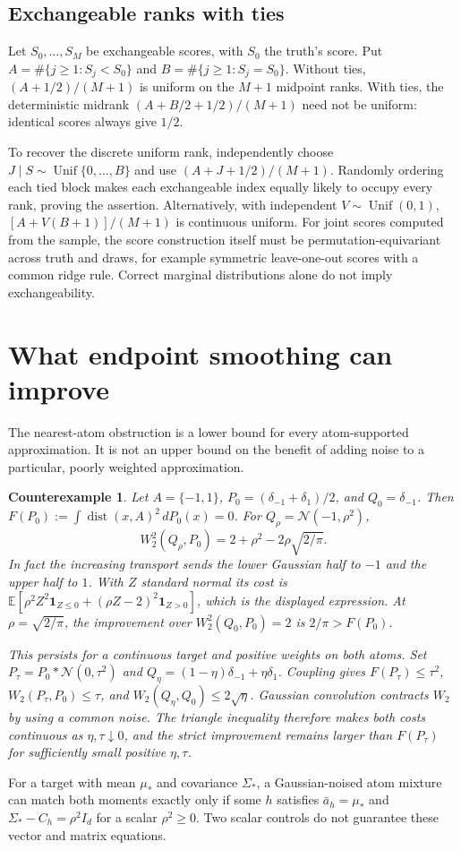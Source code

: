 \documentclass[11pt]{article}
\newtheorem{example}[theorem]{Counterexample}
\newcommand{\E}{\mathbb E}
\newcommand{\dist}{\operatorname{dist}}
\begin{document}
\subsection{Exchangeable ranks with ties}
Let $S_0,\ldots,S_M$ be exchangeable scores, with $S_0$ the truth's score. Put
$A=\#\{j\ge1:S_j<S_0\}$ and $B=\#\{j\ge1:S_j=S_0\}$.
Without ties, $(A+1/2)/(M+1)$ is uniform on the $M+1$ midpoint ranks. With ties,
the deterministic midrank $(A+B/2+1/2)/(M+1)$ need not be uniform: identical
scores always give $1/2$.

To recover the discrete uniform rank, independently choose
$J\mid S\sim\operatorname{Unif}\{0,\ldots,B\}$ and use
$(A+J+1/2)/(M+1)$. Randomly ordering each tied block makes each exchangeable
index equally likely to occupy every rank, proving the assertion.
Alternatively, with independent $V\sim\operatorname{Unif}(0,1)$,
$[A+V(B+1)]/(M+1)$ is continuous uniform. For joint scores computed from the
sample, the score construction itself must be permutation-equivariant across
truth and draws, for example symmetric leave-one-out scores with a common
ridge rule. Correct marginal distributions alone do not imply exchangeability.

\section{What endpoint smoothing can improve}
The nearest-atom obstruction is a lower bound for every atom-supported
approximation. It is not an upper bound on the benefit of adding noise to a
particular, poorly weighted approximation.
\begin{example}\label{ex:smoothing}
Let $A=\{-1,1\}$, $P_0=(\delta_{-1}+\delta_1)/2$, and $Q_0=\delta_{-1}$.
Then $F(P_0):=\int\dist(x,A)^2\,dP_0(x)=0$. For $Q_\rho=\mathcal N(-1,\rho^2)$,
\[
W_2^2(Q_\rho,P_0)=2+\rho^2-2\rho\sqrt{2/\pi}.
\]
In fact the increasing transport sends the lower Gaussian half to $-1$ and
the upper half to $1$. With $Z$ standard normal its cost is
$\E[\rho^2Z^2\mathbf1_{Z\le0}+(\rho Z-2)^2\mathbf1_{Z>0}]$,
which is the displayed expression. At $\rho=\sqrt{2/\pi}$, the improvement
over $W_2^2(Q_0,P_0)=2$ is $2/\pi>F(P_0)$.

This persists for a continuous target and positive weights on both atoms.
Set $P_\tau=P_0*\mathcal N(0,\tau^2)$ and
$Q_\eta=(1-\eta)\delta_{-1}+\eta\delta_1$. Coupling gives
$F(P_\tau)\le\tau^2$, $W_2(P_\tau,P_0)\le\tau$, and
$W_2(Q_\eta,Q_0)\le2\sqrt\eta$. Gaussian convolution contracts $W_2$ by
using a common noise. The triangle inequality therefore makes both costs
continuous as $\eta,\tau\downarrow0$, and the strict improvement remains
larger than $F(P_\tau)$ for sufficiently small positive $\eta,\tau$.
\end{example}
For a target with mean $\mu_*$ and covariance $\Sigma_*$, a Gaussian-noised
atom mixture can match both moments exactly only if some $h$ satisfies
$\bar a_h=\mu_*$ and $\Sigma_*-C_h=\rho^2I_d$ for a scalar $\rho^2\ge0$.
Two scalar controls do not guarantee these vector and matrix equations.
\end{document}
